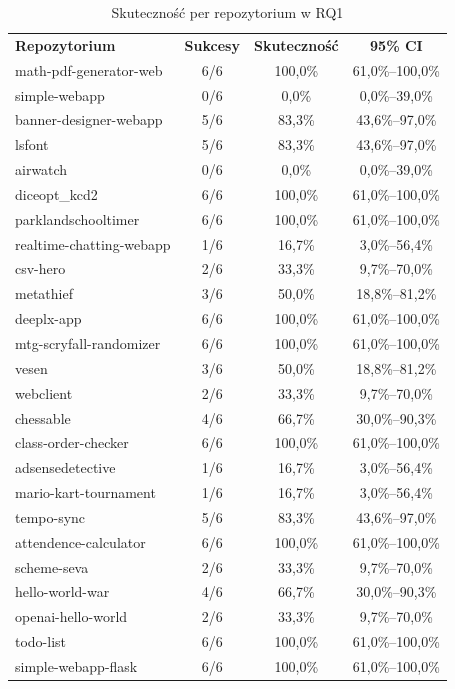 \begin{table}[h]
    \centering
    \begin{tabular}{lccc}
        \textbf{Repozytorium} & \textbf{Sukcesy} & \textbf{Skuteczność} & \textbf{95\% CI} \\
        math-pdf-generator-web & 6/6 & 100{,}0\% & 61{,}0\%--100{,}0\% \\
        simple-webapp & 0/6 & 0{,}0\% & 0{,}0\%--39{,}0\% \\
        banner-designer-webapp & 5/6 & 83{,}3\% & 43{,}6\%--97{,}0\% \\
        lsfont & 5/6 & 83{,}3\% & 43{,}6\%--97{,}0\% \\
        airwatch & 0/6 & 0{,}0\% & 0{,}0\%--39{,}0\% \\
        diceopt\_kcd2 & 6/6 & 100{,}0\% & 61{,}0\%--100{,}0\% \\
        parklandschooltimer & 6/6 & 100{,}0\% & 61{,}0\%--100{,}0\% \\
        realtime-chatting-webapp & 1/6 & 16{,}7\% & 3{,}0\%--56{,}4\% \\
        csv-hero & 2/6 & 33{,}3\% & 9{,}7\%--70{,}0\% \\
        metathief & 3/6 & 50{,}0\% & 18{,}8\%--81{,}2\% \\
        deeplx-app & 6/6 & 100{,}0\% & 61{,}0\%--100{,}0\% \\
        mtg-scryfall-randomizer & 6/6 & 100{,}0\% & 61{,}0\%--100{,}0\% \\
        vesen & 3/6 & 50{,}0\% & 18{,}8\%--81{,}2\% \\
        webclient & 2/6 & 33{,}3\% & 9{,}7\%--70{,}0\% \\
        chessable & 4/6 & 66{,}7\% & 30{,}0\%--90{,}3\% \\
        class-order-checker & 6/6 & 100{,}0\% & 61{,}0\%--100{,}0\% \\
        adsensedetective & 1/6 & 16{,}7\% & 3{,}0\%--56{,}4\% \\
        mario-kart-tournament & 1/6 & 16{,}7\% & 3{,}0\%--56{,}4\% \\
        tempo-sync & 5/6 & 83{,}3\% & 43{,}6\%--97{,}0\% \\
        attendence-calculator & 6/6 & 100{,}0\% & 61{,}0\%--100{,}0\% \\
        scheme-seva & 2/6 & 33{,}3\% & 9{,}7\%--70{,}0\% \\
        hello-world-war & 4/6 & 66{,}7\% & 30{,}0\%--90{,}3\% \\
        openai-hello-world & 2/6 & 33{,}3\% & 9{,}7\%--70{,}0\% \\
        todo-list & 6/6 & 100{,}0\% & 61{,}0\%--100{,}0\% \\
        simple-webapp-flask & 6/6 & 100{,}0\% & 61{,}0\%--100{,}0\% \\
    \end{tabular}
    \caption{Skuteczność per repozytorium w RQ1}
    \label{tab:h1-repos}
\end{table}

